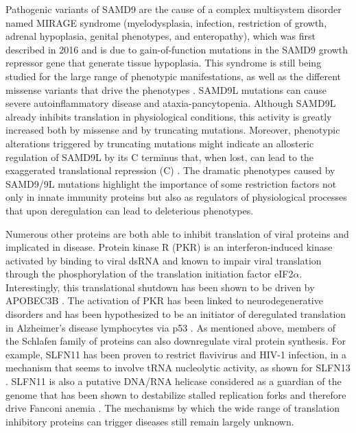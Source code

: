 \documentclass{enslyonreview}
\begin{document}
Pathogenic variants of SAMD9 are the cause of a complex multisystem disorder named MIRAGE
syndrome (myelodysplasia, infection, restriction of growth, adrenal hypoplasia, genital
phenotypes, and enteropathy), which was first described in 2016 and is due to gain-of-function
mutations in the SAMD9 growth repressor gene that generate tissue hypoplasia. This syndrome is
still being studied for the large range of phenotypic manifestations, as well as the different
missense variants that drive the phenotypes \cite{suntharalinghamEmergingPhenotypesLinked2022}. SAMD9L mutations can
cause severe autoinflammatory disease and ataxia-pancytopenia. Although SAMD9L already
inhibits translation in physiological conditions, this activity is greatly increased both by
missense and by truncating mutations. Moreover, phenotypic alterations triggered by truncating
mutations might indicate an allosteric regulation of SAMD9L by its C terminus that, when lost,
can lead to the exaggerated translational repression (C) \cite{russellSAMD9LAutoinflammatoryAtaxia2021}.
The dramatic phenotypes caused by SAMD9/9L mutations highlight the importance of some
restriction factors not only in innate immunity proteins but also as regulators of
physiological processes that upon deregulation can lead to deleterious phenotypes.

Numerous other proteins are both able to inhibit translation of viral proteins and implicated
in disease. Protein kinase R (PKR) is an interferon-induced kinase activated by binding to
viral dsRNA and known to impair viral translation through the phosphorylation of the
translation initiation factor eIF2$\alpha$. Interestingly, this translational shutdown has
been shown to be driven by APOBEC3B \cite{manjunathAPOBEC3BDrivesPKRmediated2023}. The activation of PKR has been
linked to neurodegenerative disorders and has been hypothesized to be an initiator of
deregulated translation in Alzheimer's disease lymphocytes via p53 \cite{morelPKRDoubleStranded2009}. As
mentioned above, members of the Schlafen family of proteins can also downregulate viral
protein synthesis. For example, SLFN11 has been proven to restrict flavivirus and HIV-1
infection, in a mechanism that seems to involve tRNA nucleolytic activity, as shown for
SLFN13 \cite{valdezSchlafen11Restricts2019}. SLFN11 is also a putative DNA/RNA helicase considered as a guardian
of the genome that has been shown to destabilize stalled replication forks and therefore
drive Fanconi anemia \cite{okamotoSLFN11PromotesStalled2021a}. The mechanisms by which the wide range of translation
inhibitory proteins can trigger diseases still remain largely unknown.
\end{document}
